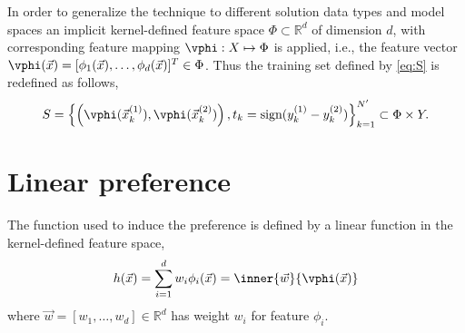 In order to generalize the technique to different solution data types and model spaces an implicit kernel-defined feature space $\Phi\subset\mathbb{R}^d$ of dimension $d$, with corresponding feature mapping $\vphi:X\mapsto\Phi$ is applied, i.e., the feature vector $\vphi(\vec{x})=[\phi_1(\vec{x}),\ldots,\phi_d(\vec{x})]^T\in\Phi$. Thus the training set defined by \cref{eq:S} is redefined as follows,
\begin{equation}
S = \left\{\left(\vphi(\vec{x}_k^{(1)}), \vphi(\vec{x}_k^{(2)})\right),t_k=\text{sign}(y_k^{(1)} - y_k^{(2)})\right\}_{k=1}^{N'} \subset \Phi \times Y \label{eq:Sfeat}.
\end{equation}


\section{Linear preference}\label{sec:ord:linpref}
The function used to induce the preference is defined by a linear function in the kernel-defined feature space,
\begin{equation} 
 h(\vec{x})=\sum_{i=1}^d w_i\phi_i(\vec{x})=\inner{\vec{w}}{\vphi(\vec{x})} \label{eq:linearpref}
\end{equation}
where $\vec{w}=[w_1,\ldots,w_d]\in\mathbb{R}^d$ has weight $w_i$ for feature $\phi_i$.


\begin{comment}
Let $\vec{z}$ denote either $\vphi(\vec{x}_k^{(1)})-\vphi(\vec{x}_k^{(2)})$ with \mbox{$t_k=+1$} or 
$\vphi(\vec{x}_k^{(2)})-\vphi(\vec{x}_k^{(1)})$ with \mbox{$t_k=-1$}, positive or negative example respectively.

Logistic regression learns the optimal parameters $\vec{w}\in\mathbb{R}^d$ determined by solving the following task,
\begin{equation}\label{eq:margin}
\min_{\vec{w}}\quad \tfrac{1}{2}\inner{\vec{w}}{\vec{w}} + C \sum_{i=1}^{N'} \log\left(1 + e^{-y_i \inner{\vec{w}}{\vec{z}_i}}\right) 
\end{equation}
where $C > 0$ is a penalty parameter, and the negative log-likelihood is due to the fact the given data point $\vec{z}_i$ and weights $\vec{w}$ are assumed to follow the probability model,
\begin{equation}\label{eq:prob}
\mathcal{P}\big(y=\pm1|\vec{z},\vec{w}\big)=\frac{1}{1+e^{-y\inner{\vec{w}}{\vec{z}_i}}}.
\end{equation}
The logistic regression defined in \cref{eq:margin} is solved iteratively, in particular using Trust Region Newton method \citep[cf.][]{Lin08:newtontrustregion}, which generates a sequence $\{\vec{w}^{(k)}\}_{k=1}^\infty$ converging to the optimal solution $\vec{w}^*$ of \cref{eq:margin}.
\end{comment}

